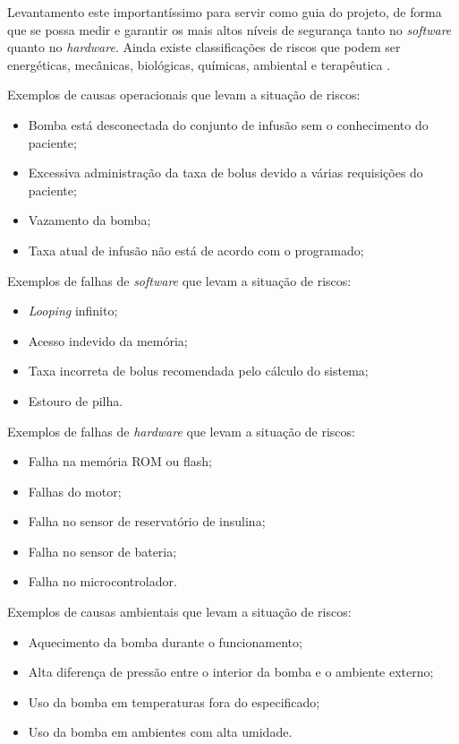 Levantamento este importantíssimo para servir como guia do projeto, de forma que se possa medir e garantir os mais altos níveis de segurança tanto no \emph{software} quanto no \emph{hardware}. Ainda existe classificações de riscos que podem ser energéticas, mecânicas, biológicas, químicas, ambiental e terapêutica \cite{zhang2010hazard}. 

Exemplos de causas operacionais que levam a situação de riscos:
\begin{itemize}
\item Bomba está desconectada do conjunto de infusão sem o conhecimento do paciente;
\item Excessiva administração da taxa de bolus devido a várias requisições do paciente;
\item Vazamento da bomba;
\item Taxa atual de infusão não está de acordo com o programado;
\end{itemize}

Exemplos de falhas de \emph{software} que levam a situação de riscos:
\begin{itemize}
\item \emph{Looping} infinito;
\item Acesso indevido da memória;
\item Taxa incorreta de bolus recomendada pelo cálculo do sistema;	
\item Estouro de pilha.
\end{itemize}

Exemplos de falhas de \emph{hardware} que levam a situação de riscos:
\begin{itemize}
\item Falha na memória ROM ou flash;
\item Falhas do motor;
\item Falha no sensor de reservatório de insulina;	
\item Falha no sensor de bateria;
\item Falha no microcontrolador.
\end{itemize}

Exemplos de causas ambientais que levam a situação de riscos:
\begin{itemize}
\item Aquecimento da bomba durante o funcionamento;
\item Alta diferença de pressão entre o interior da bomba e o ambiente externo;
\item Uso da bomba em temperaturas fora do especificado;
\item Uso da bomba em ambientes com alta umidade.
\end{itemize}

